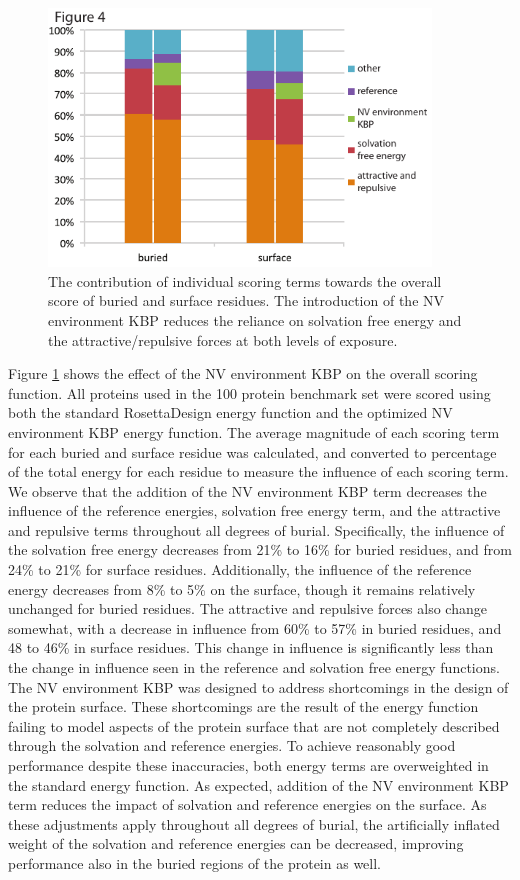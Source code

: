 \begin{figure}
\centering
\includegraphics[width=4in]{figures/nv_kbp/term_contribution}
\caption{
The contribution of individual scoring terms towards the overall score of buried and surface residues.
The introduction of the \acs{NV} environment \acs{KBP} reduces the reliance on solvation free energy and the attractive/repulsive forces at both levels of exposure. 
}
\label{fig:term_contribution}
\end{figure}

Figure \ref{fig:term_contribution} shows the effect of the \ac{NV} environment \ac{KBP} on the overall scoring function.
All proteins used in the 100 protein benchmark set were scored using both the standard RosettaDesign energy function and the optimized \ac{NV} environment \ac{KBP} energy function. 
The average magnitude of each scoring term for each buried and surface residue was calculated, and converted to percentage of the total energy for each residue to measure the influence of each scoring term.
We observe that the addition of the \ac{NV} environment \ac{KBP} term decreases the influence of the reference energies, solvation free energy term, and the attractive and repulsive terms throughout all degrees of burial.
Specifically, the influence of the solvation free energy decreases from 21\% to 16\% for buried residues, and from 24\% to 21\% for surface residues.
Additionally, the influence of the reference energy decreases from 8\% to 5\% on the surface, though it remains relatively unchanged for buried residues.
The attractive and repulsive forces also change somewhat, with a decrease in influence from 60\% to 57\% in buried residues, and 48 to 46\% in surface residues.
This change in influence is significantly less than the change in influence seen in the reference and solvation free energy functions.
The \ac{NV} environment \ac{KBP} was designed to address shortcomings in the design of the protein surface.
These shortcomings are the result of the energy function failing to model aspects of the protein surface that are not completely described through the solvation and reference energies.
To achieve reasonably good performance despite these inaccuracies, both energy terms are overweighted in the standard energy function.
As expected, addition of the \ac{NV} environment \ac{KBP} term reduces the impact of solvation and reference energies on the surface.
As these adjustments apply throughout all degrees of burial, the artificially inflated weight of the solvation and reference energies can be decreased, improving performance also in the buried regions of the protein as well.

